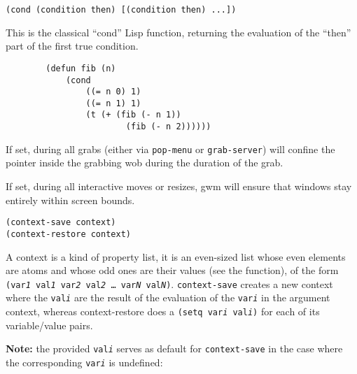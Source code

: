         
{\usagefont\begin{verbatim}
(cond (condition then) [(condition then) ...])
\end{verbatim}}\usageupspace

This is the classical ``cond'' Lisp function, returning the evaluation of the
``then'' part of the first true condition.

{\exemplefont\begin{verbatim}
        (defun fib (n)
            (cond
                ((= n 0) 1)
                ((= n 1) 1)
                (t (+ (fib (- n 1)) 
                        (fib (- n 2))))))
\end{verbatim}}



If set, during all grabs (either via \verb"pop-menu" or \verb"grab-server")
will confine the pointer inside the grabbing wob during the duration of
the grab.



If set, during all interactive moves or resizes, gwm will ensure that windows
stay entirely within screen bounds.

        
{\usagefont\begin{verbatim}
(context-save context)
(context-restore context)
\end{verbatim}}\usageupspace

A context is a kind of property list, it is an even-sized list whose even
elements are atoms and whose odd ones are their values (see the 
function), of the form {\tt (var{\it 1\/} val{\it 1\/} var{\it 2\/} val{\it 2\/} \ldots
var{\it N\/} val{\it N\/})}. \verb"context-save" creates a new context
where the {\tt val{\it i\/}} are the result of the evaluation of the
{\tt var{\it i\/}} in the argument context, whereas context-restore does
a {\tt (setq var{\it i\/} val{\it i\/})} for each of its variable/value pairs.

{\bf Note:} the provided {\tt val{\it i}} serves as default for
\verb"context-save" in the case where the corresponding {\tt var{\it i}} is
undefined:

